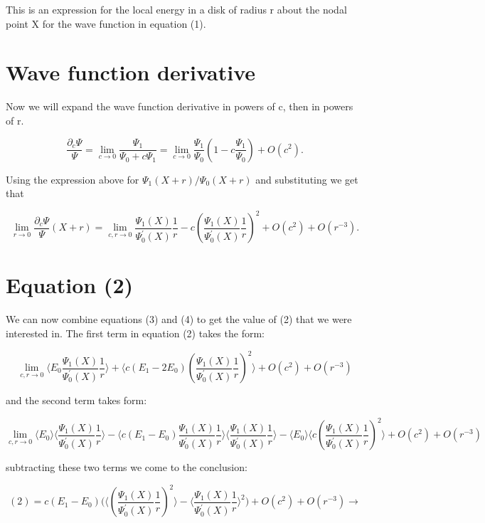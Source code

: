 \documentclass{article}
\begin{document}
This is an expression for the local energy in a disk of radius r about the nodal point X for the wave function in equation (1).

\section{Wave function derivative}
Now we will expand the wave function derivative in powers of c, then in powers of r.

$$\frac{\partial_c \Psi}{\Psi} = \lim_{c \rightarrow 0}\frac{\Psi_1}{\Psi_0 + c\Psi_1} = \lim_{c \rightarrow 0} \frac{\Psi_1}{\Psi_0}(1-c\frac{\Psi_1}{\Psi_0})+O(c^2).$$

Using the expression above for $\Psi_1(X+r)/\Psi_0(X+r)$ and substituting we get that

\begin{equation}
\boxed{\lim_{r\rightarrow 0}\frac{\partial_c \Psi}{\Psi}(X+r) = \lim_{c,r \rightarrow 0} \frac{\Psi_1(X)}{\Psi_0^\prime(X)}\frac{1}{r} - c (\frac{\Psi_1(X)}{\Psi_0^\prime(X)}\frac{1}{r})^2+O(c^2) + O(r^{-3})}.
\end{equation}

\section{Equation (2)}
We can now combine equations (3) and (4) to get the value of (2) that we were interested in. The first term in equation (2) takes the form:
 
$$\lim_{c,r \rightarrow 0} \langle E_0 \frac{\Psi_1(X)}{\Psi_0^\prime(X)}\frac{1}{r} \rangle + \langle c(E_1-2E_0)(\frac{\Psi_1(X)}{\Psi_0^\prime(X)}\frac{1}{r})^2 \rangle + O(c^2) + O(r^{-3})$$

and the second term takes form:

$$\lim_{c,r \rightarrow 0} \langle E_0 \rangle \langle \frac{\Psi_1(X)}{\Psi_0^\prime(X)}\frac{1}{r} \rangle - \langle c(E_1 - E_0)\frac{\Psi_1(X)}{\Psi_0^\prime(X)}\frac{1}{r} \rangle \langle \frac{\Psi_1(X)}{\Psi_0^\prime(X)}\frac{1}{r} \rangle - \langle E_0 \rangle \langle c (\frac{\Psi_1(X)}{\Psi_0^\prime(X)}\frac{1}{r})^2 \rangle + O(c^2) + O(r^{-3})$$

subtracting these two terms we come to the conclusion:

$$
(2) = c(E_1-E_0) \Big( \langle (\frac{\Psi_1(X)}{\Psi_0^\prime(X)}\frac{1}{r} )^2 \rangle - \langle \frac{\Psi_1(X)}{\Psi_0^\prime(X)}\frac{1}{r} \rangle ^2 \Big) + O(c^2) + O(r^{-3}) \rightarrow 
$$
\end{document}
